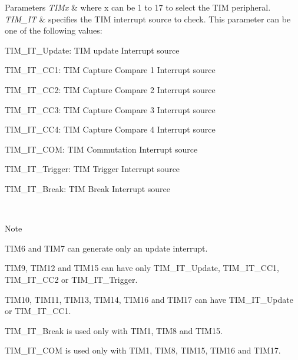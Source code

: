 \begin{DoxyParams}{Parameters}
{\em T\+I\+Mx} & where x can be 1 to 17 to select the T\+IM peripheral. \\
\hline
{\em T\+I\+M\+\_\+\+IT} & specifies the T\+IM interrupt source to check. This parameter can be one of the following values\+: \begin{DoxyItemize}
\item T\+I\+M\+\_\+\+I\+T\+\_\+\+Update\+: T\+IM update Interrupt source \item T\+I\+M\+\_\+\+I\+T\+\_\+\+C\+C1\+: T\+IM Capture Compare 1 Interrupt source \item T\+I\+M\+\_\+\+I\+T\+\_\+\+C\+C2\+: T\+IM Capture Compare 2 Interrupt source \item T\+I\+M\+\_\+\+I\+T\+\_\+\+C\+C3\+: T\+IM Capture Compare 3 Interrupt source \item T\+I\+M\+\_\+\+I\+T\+\_\+\+C\+C4\+: T\+IM Capture Compare 4 Interrupt source \item T\+I\+M\+\_\+\+I\+T\+\_\+\+C\+OM\+: T\+IM Commutation Interrupt source \item T\+I\+M\+\_\+\+I\+T\+\_\+\+Trigger\+: T\+IM Trigger Interrupt source \item T\+I\+M\+\_\+\+I\+T\+\_\+\+Break\+: T\+IM Break Interrupt source \end{DoxyItemize}
\\
\hline
\end{DoxyParams}
\begin{DoxyNote}{Note}

\begin{DoxyItemize}
\item T\+I\+M6 and T\+I\+M7 can generate only an update interrupt.
\item T\+I\+M9, T\+I\+M12 and T\+I\+M15 can have only T\+I\+M\+\_\+\+I\+T\+\_\+\+Update, T\+I\+M\+\_\+\+I\+T\+\_\+\+C\+C1, T\+I\+M\+\_\+\+I\+T\+\_\+\+C\+C2 or T\+I\+M\+\_\+\+I\+T\+\_\+\+Trigger.
\item T\+I\+M10, T\+I\+M11, T\+I\+M13, T\+I\+M14, T\+I\+M16 and T\+I\+M17 can have T\+I\+M\+\_\+\+I\+T\+\_\+\+Update or T\+I\+M\+\_\+\+I\+T\+\_\+\+C\+C1.
\item T\+I\+M\+\_\+\+I\+T\+\_\+\+Break is used only with T\+I\+M1, T\+I\+M8 and T\+I\+M15.
\item T\+I\+M\+\_\+\+I\+T\+\_\+\+C\+OM is used only with T\+I\+M1, T\+I\+M8, T\+I\+M15, T\+I\+M16 and T\+I\+M17. 
\end{DoxyItemize}
\end{DoxyNote}

